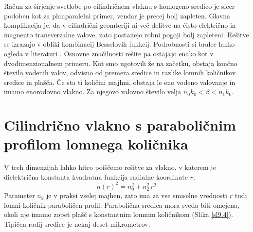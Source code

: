 Račun za širjenje svetlobe po cilindričnem vlaknu s homogeno sredico
je sicer podoben kot za planparalelni primer, vendar je precej bolj
zapleten. Glavna komplikacija je, da v cilindrični geomteriji ni več
delitve na čisto električno in magnento transverzalne valove, zato
postanejo robni pogoji bolj zapleteni. Rešitve se izrazajo v obliki
kombinacij Besselovih funkcij. Podrobnosti si bralec lahko ogleda
v literaturi \cite{vlakna}. Osnovne značilnosti rešite pa ostajajo
enako kot v dvodimenzionalnem primeru. Kot smo ugotovili že na začetku,
obstaja končno število vodenih valov, odvisno od premera sredice in
razlike lomnih količnikov sredice in plašča. Če sta ti količini majhni,
obstaja le eno vodeno valovanje in imamo enorodovno vlakno. Za njegovo
valovno število velja $n_{0}k_{0}<\beta<n_{1}k_{0}$.


\section{Cilindrično vlakno s paraboličnim profilom lomnega količnika}

V treh dimenzijah lahko hitro poiščemo rešitve za vlakno, v katerem
je dielektrična konstanta kvadratna funkcija radialne koordinate $r$:
\begin{equation}
n\left(r\right)^{2}=n_{0}^{2}+n_{2}^{2}\, r^{2}\label{9.15}
\end{equation}
 Parameter $n_{2}$ je v praksi vselej majhen, zato ima za vse smiselne
vrednosti $r$ tudi lomni količnik paraboličen profil. Parabolična
sredica mora sveda biti omejena, okoli nje imamo zopet plašč s konstantnim
lomnim količnikom (Slika \ref{sl9.4}). Tipičen radij sredice je nekaj
deset mikrometrov.


